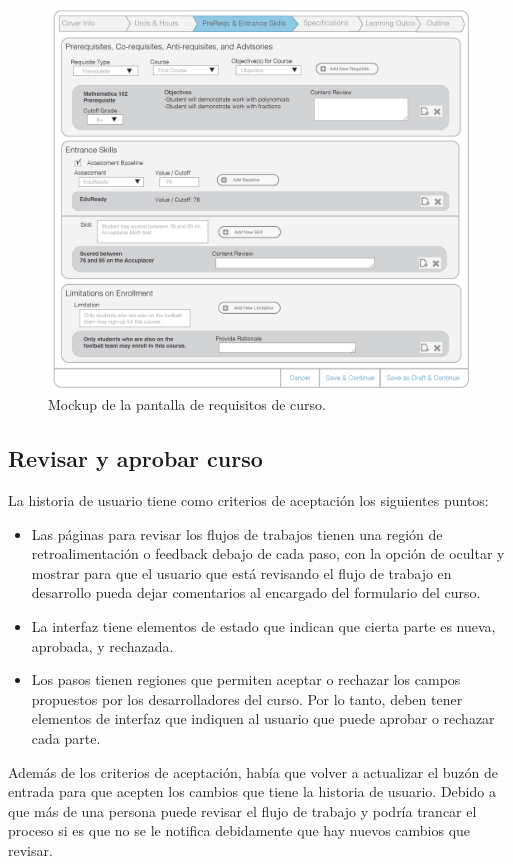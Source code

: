 \begin{figure}[H]
\centering
\includegraphics[scale=0.3]{Capitulos/DesarrollodelaAplicacion/Imagenes/course_req}
\caption{Mockup de la pantalla de requisitos de curso.}
  \label{course_req}
\end{figure}

\subsection{Revisar y aprobar curso}
La historia de usuario tiene como criterios de aceptación los siguientes puntos:
\begin{itemize}
	\item Las páginas para revisar los flujos de trabajos tienen una región de retroalimentación o feedback debajo de cada paso, con la opción de ocultar y mostrar para que el usuario que está revisando el flujo de trabajo en desarrollo pueda dejar comentarios al encargado del formulario del curso.
	\item La interfaz tiene elementos de estado que indican que cierta parte es nueva, aprobada, y rechazada.
	\item Los pasos tienen regiones que permiten aceptar o rechazar los campos propuestos por los desarrolladores del curso. Por lo tanto, deben tener elementos de interfaz que indiquen al usuario que puede aprobar o rechazar cada parte.
\end{itemize}
Además de los criterios de aceptación, había que volver a actualizar el buzón de entrada para que acepten los cambios que tiene la historia de usuario. Debido a que más de una persona puede revisar el flujo de trabajo y podría trancar el proceso si es que no se le notifica debidamente que hay nuevos cambios que revisar.

